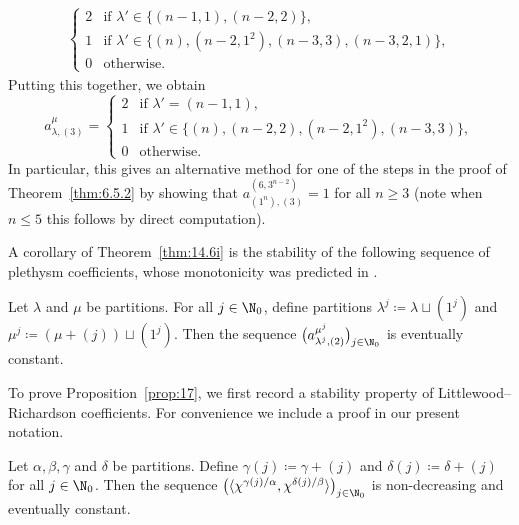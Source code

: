 \begin{example}
\begin{align*}
\begin{cases}
			2 & \text{if }\lambda'\in\{(n-1,1),(n-2,2)\},\\
			1 & \text{if }\lambda'\in\{(n),(n-2,1^2),(n-3,3),(n-3,2,1)\},\\
			0 & \text{otherwise}.
		\end{cases}
	\end{align*}
	Putting this together, we obtain
	\[ a^\mu_{\lambda,(3)} = \begin{cases}
		2 & \text{if }\lambda'=(n-1,1),\\
		1 & \text{if }\lambda'\in\{(n),(n-2,2),(n-2,1^2),(n-3,3)\},\\
		0 & \text{otherwise}.
	\end{cases} \]
	In particular, this gives an alternative method for one of the steps in the proof of Theorem~\ref{thm:6.5.2} by showing that $a^{(6,3^{n-2})}_{(1^n),(3)}=1$ for all $n\ge 3$ (note when $n\le 5$ this follows by direct computation).%
\end{example}

A corollary of Theorem~\ref{thm:14.6i} is the stability of the following sequence of plethysm coefficients, whose monotonicity was predicted in \cite[Conjecture 1.2]{BBP}.

\begin{proposition}\label{prop:17}
	Let $\lambda$ and $\mu$ be partitions. For all $j\in\N_0$, define partitions $\lambda^j\coloneqq \lambda\sqcup(1^j)$ and $\mu^j\coloneqq (\mu+(j))\sqcup(1^j)$. Then the sequence $\big(a^{\mu^j}_{\lambda^j,(2)}\big)_{j\in\N_0}$ is eventually constant.
\end{proposition}

To prove Proposition~\ref{prop:17}, we first record a stability property of Littlewood--Richardson coefficients. For convenience we include a proof in our present notation.
\begin{lemma}\label{lem:lr-stab}
	Let $\alpha,\beta,\gamma$ and $\delta$ be partitions. Define $\gamma(j)\coloneqq \gamma+(j)$ and $\delta(j)\coloneqq \delta+(j)$ for all $j\in\N_0$. Then the sequence $\big( \langle\chi^{\gamma(j)/\alpha},\chi^{\delta(j)/\beta}\rangle \big)_{j\in\N_0}$ is non-decreasing and eventually constant.
\end{lemma}

